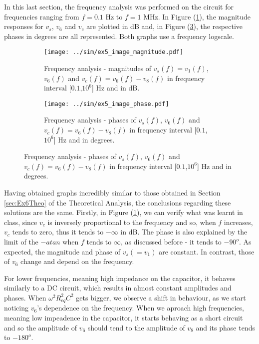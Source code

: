 In this last section, the frequency analysis was performed on the circuit for frequencies ranging from $f=0.1$ Hz to $f=1$ MHz. In Figure (\ref{fig:Ex5_Image_Magnitude}), the magnitude responses for $v_s$, $v_6$ and $v_c$ are plotted in dB and, in Figure (\ref{fig:Ex5_Image_Phase}), the respective phases in degrees are all represented. Both graphs use a frequency logscale.

\begin{figure}[H]
  \begin{subfigure}{.49\linewidth}
    \centering
    \texttt{[image: ../sim/ex5\_image\_magnitude.pdf]}
    \footnotesize
    \caption{Frequency analysis - magnitudes of $v_s(f)=v_1(f)$, $v_6(f)$ and $v_c(f)=v_6(f)-v_8(f)$ in frequency interval [$0.1$,$10^{6}$] Hz and in dB.}
    \label{fig:Ex5_Image_Magnitude}
  \end{subfigure}
  \hspace{5mm}
  \begin{subfigure}{.49\linewidth}
    \centering
    \texttt{[image: ../sim/ex5\_image\_phase.pdf]}  
    \caption{Frequency analysis - phases of $v_s(f)$, $v_6(f)$ and $v_c(f)=v_6(f)-v_8(f)$ in frequency interval [$0.1$,$10^{6}$] Hz and in degrees.}
    \label{fig:Ex5_Image_Phase}
  \end{subfigure}
\end{figure}

Having obtained graphs incredibly similar to those obtained in Section \ref{sec:Ex6Theo} of the Theoretical Analysis, the conclusions regarding these solutions are the same. Firstly, in Figure (\ref{fig:Ex5_Image_Magnitude}), we can verify what was learnt in class, since $v_c$ is inversely proportional to the frequency and so, when $f$ increases, $v_c$  tends to zero, thus it tends to $-\infty$ in dB. The phase is also explained by the limit of the $-atan$ when $f$ tends to $\infty$, as discussed before - it tends to $-90^{o}$.  As expected, the magnitude and phase of $v_s(=v_1)$ are constant. In contrast, those of $v_6$ change and depend on the frequency.
\par
For lower frequencies, meaning high impedance on the capacitor, it behaves similarly to a DC circuit, which results in almost constant amplitudes and phases. When $\omega^{2}R_{eq}^{2}C^{2}$ gets bigger, we observe a shift in behaviour, as we start noticing $v_6$'s dependence on the frequency. When we aproach high frequencies, meaning low impeadence in the capacitor, it starts behaving as a short circuit and so the amplitude of $v_6$ should tend to the amplitude of $v_8$ and its phase tends to $-180^{o}$.   
